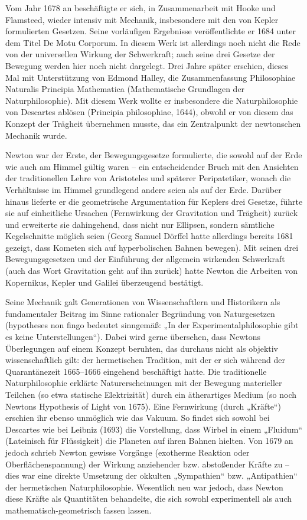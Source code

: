 Vom Jahr 1678 an beschäftigte er sich, in Zusammenarbeit mit Hooke und Flamsteed, wieder intensiv mit Mechanik, insbesondere mit den von Kepler formulierten Gesetzen. Seine vorläufigen Ergebnisse veröffentlichte er 1684 unter dem Titel De Motu Corporum. In diesem Werk ist allerdings noch nicht die Rede von der universellen Wirkung der Schwerkraft; auch seine drei Gesetze der Bewegung werden hier noch nicht dargelegt. Drei Jahre später erschien, dieses Mal mit Unterstützung von Edmond Halley, die Zusammenfassung Philosophiae Naturalis Principia Mathematica (Mathematische Grundlagen der Naturphilosophie). Mit diesem Werk wollte er insbesondere die Naturphilosophie von Descartes ablösen (Principia philosophiae, 1644), obwohl er von diesem das Konzept der Trägheit übernehmen musste, das ein Zentralpunkt der newtonschen Mechanik wurde.

Newton war der Erste, der Bewegungsgesetze formulierte, die sowohl auf der Erde wie auch am Himmel gültig waren – ein entscheidender Bruch mit den Ansichten der traditionellen Lehre von Aristoteles und späterer Peripatetiker, wonach die Verhältnisse im Himmel grundlegend andere seien als auf der Erde. Darüber hinaus lieferte er die geometrische Argumentation für Keplers drei Gesetze, führte sie auf einheitliche Ursachen (Fernwirkung der Gravitation und Trägheit) zurück und erweiterte sie dahingehend, dass nicht nur Ellipsen, sondern sämtliche Kegelschnitte möglich seien (Georg Samuel Dörffel hatte allerdings bereits 1681 gezeigt, dass Kometen sich auf hyperbolischen Bahnen bewegen). Mit seinen drei Bewegungsgesetzen und der Einführung der allgemein wirkenden Schwerkraft (auch das Wort Gravitation geht auf ihn zurück) hatte Newton die Arbeiten von Kopernikus, Kepler und Galilei überzeugend bestätigt.

Seine Mechanik galt Generationen von Wissenschaftlern und Historikern als fundamentaler Beitrag im Sinne rationaler Begründung von Naturgesetzen (hypotheses non fingo bedeutet sinngemäß: „In der Experimentalphilosophie gibt es keine Unterstellungen“). Dabei wird gerne übersehen, dass Newtons Überlegungen auf einem Konzept beruhten, das durchaus nicht als objektiv wissenschaftlich gilt: der hermetischen Tradition, mit der er sich während der Quarantänezeit 1665–1666 eingehend beschäftigt hatte. Die traditionelle Naturphilosophie erklärte Naturerscheinungen mit der Bewegung materieller Teilchen (so etwa statische Elektrizität) durch ein ätherartiges Medium (so noch Newtons Hypothesis of Light von 1675). Eine Fernwirkung (durch „Kräfte“) erschien ihr ebenso unmöglich wie das Vakuum. So findet sich sowohl bei Descartes wie bei Leibniz (1693) die Vorstellung, dass Wirbel in einem „Fluidum“ (Lateinisch für Flüssigkeit) die Planeten auf ihren Bahnen hielten. Von 1679 an jedoch schrieb Newton gewisse Vorgänge (exotherme Reaktion oder Oberflächenspannung) der Wirkung anziehender bzw. abstoßender Kräfte zu – dies war eine direkte Umsetzung der okkulten „Sympathien“ bzw. „Antipathien“ der hermetischen Naturphilosophie. Wesentlich neu war jedoch, dass Newton diese Kräfte als Quantitäten behandelte, die sich sowohl experimentell als auch mathematisch-geometrisch fassen lassen.


